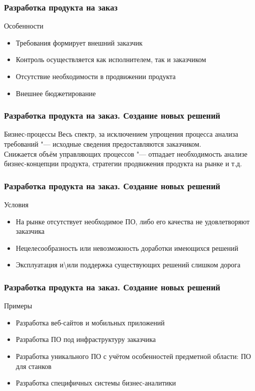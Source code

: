 \documentclass{../industrial-development}
\begin{document}
\begin{frame} \frametitle{Разработка продукта на заказ}
	\begin{block}{Особенности}
		\begin{itemize}
			\item Требования формирует внешний заказчик
			\item Контроль осуществляется как исполнителем, так и заказчиком
			\item Отсутствие необходимости в продвижении продукта
			\item Внешнее бюджетирование
		\end{itemize}
	\end{block}
\end{frame}
\lecturenotes


\begin{frame} \frametitle{Разработка продукта на заказ. Создание новых решений}
	\begin{block}{Бизнес-процессы}
		Весь спектр, за исключением упрощения процесса анализа требований "--- исходные сведения предоставляются заказчиком.\\
		Снижается объём управляющих процессов "--- отпадает необходимость анализе бизнес-концепции продукта, стратегии продвижения продукта на рынке и т.д.
	\end{block}
\end{frame}
\lecturenotes


\begin{frame} \frametitle{Разработка продукта на заказ. Создание новых решений}
	\begin{block}{Условия}
		\begin{itemize}
			\item На рынке отсутствует необходимое ПО, либо его качества не удовлетворяют заказчика
			\item Нецелесообразность или невозможность доработки имеющихся решений
			\item Эксплуатация и\textbackslash или поддержка существующих решений слишком дорога
		\end{itemize}
	\end{block}
\end{frame}
\lecturenotes


\begin{frame} \frametitle{Разработка продукта на заказ. Создание новых решений}
	\begin{block}{Примеры}
		\begin{itemize}
			\item Разработка веб-сайтов и мобильных приложений
			\item Разработка ПО под инфраструктуру заказчика
			\item Разработка уникального ПО с учётом особенностей предметной области: ПО для станков
			\item Разработка специфичных системы бизнес-аналитики
		\end{itemize}
	\end{block}
\end{frame}
\lecturenotes
\end{document}
